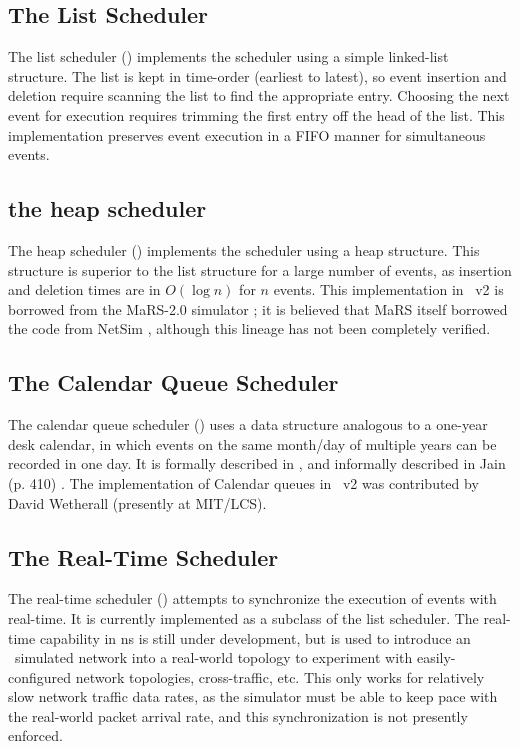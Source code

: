 \subsection{The List Scheduler}
\label{sec:listsched}

The list scheduler ()
implements the scheduler using a simple linked-list structure.
The list is kept in time-order (earliest to latest), so event
insertion and deletion require scanning the list to find the
appropriate entry.
Choosing the next event for execution requires trimming the first
entry off the head of the list.
This implementation preserves event execution in a FIFO manner
for simultaneous events.

\subsection{the heap scheduler}
\label{sec:heapsched}

The heap scheduler ()
implements the scheduler using a heap structure.
This structure is superior to the list structure for a large number
of events, as insertion and deletion times are in $O(\log n)$
for $n$ events.
This implementation in \ns~v2 is borrowed from the
MaRS-2.0 simulator \cite{Alae94:Design};
it is believed that MaRS itself borrowed the code
from NetSim \cite{Heyb89:Netsim},
although this lineage has not been completely verified.

\subsection{The Calendar Queue Scheduler}
\label{sec:cqsched}

The calendar queue scheduler
()
uses a data structure analogous to a one-year desk calendar,
in which events on the same month/day of multiple years can be recorded in
one day.
It is formally described in \cite{Brow88:Calendar}, and informally described
in Jain (p. 410) \cite{Jain91:Art}.
The implementation of Calendar queues in \ns~v2
was contributed by David Wetherall (presently at MIT/LCS).

\subsection{The Real-Time Scheduler}
\label{sec:rtsched}

The real-time scheduler ()
attempts to synchronize the execution of events with real-time.
It is currently implemented as a subclass of the list scheduler.
The real-time capability in ns is still under development, but is used
to introduce an \ns\ simulated network into a real-world topology
to experiment with easily-configured network topologies, cross-traffic, etc. 
This only works for relatively slow network traffic data rates, as the
simulator must be able to keep pace with the real-world packet arrival
rate, and this synchronization is not presently enforced.

